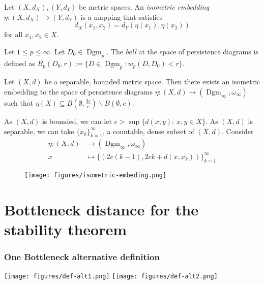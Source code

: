 \documentclass[aspectratio=169]{beamer}
\newcommand{\dgmp}{\operatorname{Dgm}_p}
\newcommand{\dgmi}{\operatorname{Dgm}_\infty}
\newcommand{\wdi}{\omega_\infty}
\begin{document}
\begin{frame}
  \begin{definition}
    Let $ (X, d_X), (Y, d_Y) $ be metric spaces. An {\it isometric embedding} $ \eta: (X, d_X) \to (Y, d_Y) $ is a mapping that satisfies
    $$
        d_X(x_1, x_2) = d_Y(\eta(x_1), \eta(x_2))
    $$
    for all $x_1, x_2 \in X$.
\end{definition}

\begin{definition}
    Let $ 1\leq p \leq \infty $. Let $ D_0 \in \dgmp $. The {\it ball} at the space of persistence diagrams is defined as $ B_p(D_0, r) := \{D \in \dgmp : w_p(D, D_0) < r \} $.
\end{definition}

  \begin{theorem}
    Let $ (X, d) $ be a separable, bounded metric space. Then there exists an isometric embedding to the space of persistence diagrams $ \eta: (X, d) \to (\dgmi, \wdi)$ such that $ \eta(X) \subseteq B(\emptyset, \frac{3c}{c}) \backslash B(\emptyset, c) $.
\end{theorem}
\end{frame}

\begin{frame}
  As $ (X, d) $ is bounded, we can let $ c > \sup \{d(x, y): \  x, y \in X\} $. As $ (X, d) $ is separable, we can take $ \{x_k\}_{k=1}^\infty $, a countable, dense subset of $ (X, d) $. Consider
    \begin{align*}
        \eta: (X, d) &\to (\dgmi, \wdi) \\
        x &\mapsto \{(2c(k-1), 2ck + d(x, x_k))\}_{k=1}^\infty
    \end{align*}
  \begin{figure}
    \texttt{[image: figures/isometric-embeding.png]}
  \end{figure}
\end{frame}


\section{Bottleneck distance for the stability theorem}

\begin{frame}
  \frametitle{One Bottleneck alternative definition}
  \texttt{[image: figures/def-alt1.png]}
  \texttt{[image: figures/def-alt2.png]}
\end{frame}
\end{document}
